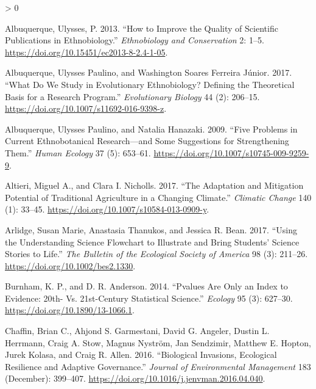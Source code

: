 \documentclass[
]{article}
\newlength{\cslhangindent}
\newenvironment{CSLReferences}[2] %
 {%
  \setlength{\parindent}{0pt}
  \ifodd #1 \everypar{\setlength{\hangindent}{\cslhangindent}}\ignorespaces\fi
  \ifnum #2 > 0
  \setlength{\parskip}{#2\baselineskip}
  \fi
 }%
 {}
\begin{document}
\hypertarget{refs}{}
\begin{CSLReferences}{1}{0}
\leavevmode\hypertarget{ref-albuquerque_how_2013}{}%
Albuquerque, Ulysses, P. 2013. {``How to Improve the Quality of Scientific Publications in Ethnobiology.''} \emph{Ethnobiology and Conservation} 2: 1--5. \url{https://doi.org/10.15451/ec2013-8-2.4-1-05}.

\leavevmode\hypertarget{ref-albuquerque_what_2017}{}%
Albuquerque, Ulysses Paulino, and Washington Soares Ferreira Júnior. 2017. {``What {Do} {We} {Study} in {Evolutionary} {Ethnobiology}? {Defining} the {Theoretical} {Basis} for a {Research} {Program}.''} \emph{Evolutionary Biology} 44 (2): 206--15. \url{https://doi.org/10.1007/s11692-016-9398-z}.

\leavevmode\hypertarget{ref-albuquerque_five_2009}{}%
Albuquerque, Ulysses Paulino, and Natalia Hanazaki. 2009. {``Five {Problems} in {Current} {Ethnobotanical} {Research}---and {Some} {Suggestions} for {Strengthening} {Them}.''} \emph{Human Ecology} 37 (5): 653--61. \url{https://doi.org/10.1007/s10745-009-9259-9}.

\leavevmode\hypertarget{ref-altieri_adaptation_2017}{}%
Altieri, Miguel A., and Clara I. Nicholls. 2017. {``The Adaptation and Mitigation Potential of Traditional Agriculture in a Changing Climate.''} \emph{Climatic Change} 140 (1): 33--45. \url{https://doi.org/10.1007/s10584-013-0909-y}.

\leavevmode\hypertarget{ref-arlidge_using_2017}{}%
Arlidge, Susan Marie, Anastasia Thanukos, and Jessica R. Bean. 2017. {``Using the {Understanding} {Science} {Flowchart} to {Illustrate} and {Bring} {Students}' {Science} {Stories} to {Life}.''} \emph{The Bulletin of the Ecological Society of America} 98 (3): 211--26. \url{https://doi.org/10.1002/bes2.1330}.

\leavevmode\hypertarget{ref-burnham_pvalues_2014}{}%
Burnham, K. P., and D. R. Anderson. 2014. {``Pvalues Are Only an Index to Evidence: 20th- Vs. 21st-Century Statistical Science.''} \emph{Ecology} 95 (3): 627--30. \url{https://doi.org/10.1890/13-1066.1}.

\leavevmode\hypertarget{ref-chaffin_biological_2016}{}%
Chaffin, Brian C., Ahjond S. Garmestani, David G. Angeler, Dustin L. Herrmann, Craig A. Stow, Magnus Nyström, Jan Sendzimir, Matthew E. Hopton, Jurek Kolasa, and Craig R. Allen. 2016. {``Biological Invasions, Ecological Resilience and Adaptive Governance.''} \emph{Journal of Environmental Management} 183 (December): 399--407. \url{https://doi.org/10.1016/j.jenvman.2016.04.040}.


\end{CSLReferences}
\end{document}
